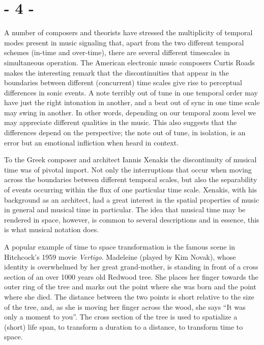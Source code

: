 \documentclass{article}
\begin{document}

\section*{- 4 -}
\label{sec:-4-}

A number of composers and theorists have stressed the multiplicity of temporal modes present in music signaling that, apart from the two different temporal schemes (in-time and over-time), there are several different timescales in simultaneous operation. 
The American electronic music composers Curtis Roads makes the interesting remark that the discontinuities that appear in the boundaries between different (concurrent) time scales give rise to perceptual differences in sonic events. \citep[4]{roads}  A note terribly out of tune in one temporal order may have just the right intonation in another, and a beat out of sync in one time scale may swing in another. \citep[For an example of the great variation in rhythmic timing among jazz musicians when observed at high temporal resolution, see][]{friberg02} In other words, depending on our temporal zoom level we may appreciate different qualities in the music. This also suggests that the differences depend on the perspective; the note out of tune, in isolation, is an error but an emotional infliction when heard in context. 

To the Greek composer and architect Iannis Xenakis the discontinuity of musical time was of pivotal import. Not only the interruptions that occur when moving across the boundaries between different temporal scales, but also the separability of events occurring within the flux of one particular time scale. Xenakis, with his background as an architect, had a great interest in the spatial properties of music in general and musical time in particular. The idea that musical time may be rendered in space, however, is common to several descriptions and in essence, this is what musical notation does.

A popular example of time to space transformation is the famous scene in Hitchcock's 1959 movie \emph{Vertigo}. Madeleine (played by Kim Novak), whose identity is overwhelmed by her great grand-mother, is standing in front of a cross section of an over 1000 years old Redwood tree. She places her finger towards the outer ring of the tree and marks out the point where she was born and the point where she died. The distance between the two points is short relative to the size of the tree, and, as she is moving her finger across the wood, she says ``It was only a moment to you''. \cite{hitchcock59} The cross section of the tree is used to spatialize a (short) life span, to transform a duration to a distance, to transform time to space. 
\end{document}
